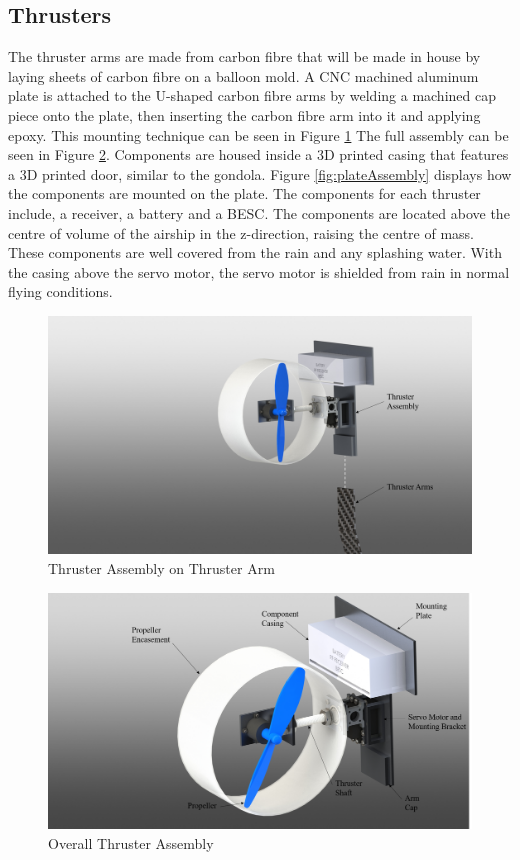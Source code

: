 \documentclass[../main.tex]{subfiles}
\begin{document}
\subsection{Thrusters}
The thruster arms are made from carbon fibre that will be made in house by laying sheets of carbon fibre on a balloon mold. A CNC machined aluminum plate is attached to the U-shaped carbon fibre arms by welding a machined cap piece onto the plate, then inserting the carbon fibre arm into it and applying epoxy. This mounting technique can be seen in Figure \ref{fig:thrusterOnKeel} The full assembly can be seen in Figure \ref{fig:thrusterAssembly}.  Components are housed inside a 3D printed casing that features a 3D printed door, similar to the gondola. Figure \ref{fig:plateAssembly} displays how the components are mounted on the plate. The components for each thruster include, a receiver, a battery and a BESC. The components are located above the centre of volume of the airship in the z-direction, raising the centre of mass. These components are well covered from the rain and any splashing water. With the casing above the servo motor, the servo motor is shielded from rain in normal flying conditions.\\
\begin{figure}[H]
	\centering
	\includegraphics[width=.8\linewidth]{img/design/thruster/thrusterOnKeel.png}
	\caption{Thruster Assembly on Thruster Arm}
	\label{fig:thrusterOnKeel}
\end{figure}

\begin{figure}[H]
	\centering
	\includegraphics[width=.8\linewidth]{img/design/thruster/thrusterAssembly.png}
	\caption{Overall Thruster Assembly}
	\label{fig:thrusterAssembly}
\end{figure}
\end{document}
